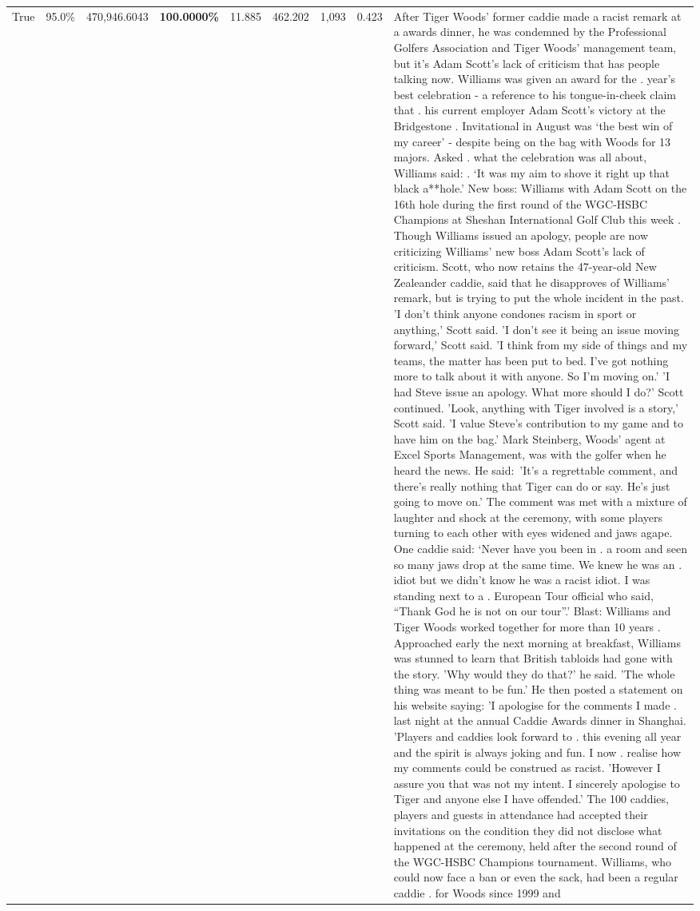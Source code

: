 \begin{table}[H]
\begin{tabular}{lllrlllll}
True & 95.0\% & 470,946.6043 & \bfseries \color{red} 100.0000\% & 11.885 & 462.202 & 1,093 & 0.423 & After Tiger Woods' former caddie made a racist remark at a awards dinner, he was condemned by the Professional Golfers Association and Tiger Woods' management team, but it's Adam Scott's lack of criticism that has people talking now. Williams was given an award for the . year’s best celebration - a reference to his tongue-in-cheek claim that . his current employer Adam Scott’s victory at the Bridgestone . Invitational in August was ‘the best win of my career’ - despite being on the bag with Woods for 13 majors. Asked . what the celebration was all about, Williams said: . ‘It was my aim to shove it right up that black a**hole.’ New boss: Williams with Adam Scott  on the 16th hole during the first round of the WGC-HSBC Champions at Sheshan International Golf Club this week . Though Williams issued an apology, people are now criticizing Williams' new boss Adam Scott's lack of criticism. Scott, who now retains the 47-year-old New Zealeander caddie, said that he disapproves of Williams' remark, but is trying to put the whole incident in the past. 'I don't think anyone condones racism in sport or anything,' Scott said. 'I don't see it being an issue moving forward,' Scott said. 'I think from my side of things and my teams, the matter has been put to bed. I've got nothing more to talk about it with anyone. So I'm moving on.' 'I had Steve issue an apology. What more should I do?' Scott continued. 'Look, anything with Tiger involved is a story,' Scott said. 'I value Steve's contribution to my game and to have him on the bag.' Mark Steinberg, Woods' agent at Excel Sports Management, was with the golfer when he heard the news. He said: 'It's a regrettable comment, and there's really nothing that Tiger can do or say. He's just going to move on.' The comment was met with a mixture of laughter and shock at the ceremony, with some players turning to each other with eyes widened and jaws agape. One caddie said: ‘Never have you been in . a room and seen so many jaws drop at the same time. We knew he was an . idiot but we didn’t know he was a racist idiot. I was standing next to a . European Tour official who said, “Thank God he is not on our tour”.’ Blast: Williams and Tiger Woods worked together for more than 10 years . Approached early the next morning at breakfast, Williams was stunned to learn that British tabloids had gone with the story. 'Why would they do that?' he said. 'The whole thing was meant to be fun.' He then posted a statement on his website saying: 'I apologise for the comments I made . last night at the annual Caddie Awards dinner in Shanghai. 'Players and caddies look forward to . this evening all year and the spirit is always joking and fun. I now . realise how my comments could be construed as racist. 'However I assure you that was not my intent. I sincerely apologise to Tiger and anyone else I have offended.' The 100 caddies, players and guests in attendance had accepted their invitations on the condition they did not disclose what happened at the ceremony, held after the second round of the WGC-HSBC Champions tournament. Williams, who could now face a ban or even the sack, had been a regular caddie . for Woods since 1999 and 
\end{tabular}
\end{table}
